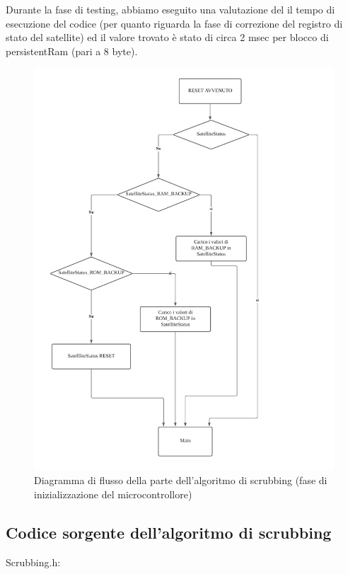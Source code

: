 \documentclass[LaM,binding=0.6cm,oneside]{../sapthesis}
\begin{document}
Durante la fase di testing, abbiamo eseguito una valutazione del il tempo di esecuzione del codice (per quanto riguarda la fase di correzione del registro di stato del satellite) ed il valore trovato è stato di circa 2 msec per blocco di persistentRam (pari a 8 byte).


\begin{figure}[htbp]
\centerline{\includegraphics[scale=0.33]{examples/DiagrammaFlussoScrubbing.jpeg}}
\caption{Diagramma di flusso della parte dell'algoritmo di scrubbing (fase di inizializzazione del microcontrollore)}
\label{fig}
\end{figure}

\clearpage

\subsection{Codice sorgente dell'algoritmo di scrubbing}

Scrubbing.h:
\end{document}
